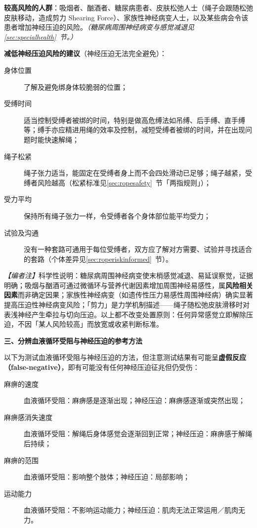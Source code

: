 \documentclass[12pt,UTF8]{ctexbook}
\begin{document}
\textbf{较高风险的人群}：吸烟者、酗酒者、糖尿病患者、皮肤松弛人士（绳子会跟随松弛皮肤移动，造成剪力 Shearing Force）、家族性神经病变人士，以及某些病会令该患者增加神经压迫的风险。\textit{（糖尿病周围神经病变与感觉减退见\ref{sec:specialhealth}~节。）}

\textbf{减低神经压迫风险的建议}（神经压迫无法完全避免）：
\begin{description}
\item[身体位置] 了解及避免绑身体较脆弱的位置；
\item[受缚时间] 适当控制受缚者被绑的时间，特别是做高危缚法如吊缚、后手缚、直手缚等；缚手亦应精进用绳的效率及控制，减短受缚者被绑的时间，并在出现问题时能快速解绳；
\item[绳子松紧] 绳子张力适当，能固定在受缚者身上而不会四处滑动已足够；绳子越紧，受缚者风险越高（松紧标准见\ref{sec:ropesafety}~节「两指规则」）；
\item[受力平均] 保持所有绳子张力一样，令受缚者各个身体部位能平均受力；
\item[试验及沟通] 没有一种套路可通用于每位受缚者，双方应了解对方需要、试验并寻找适合的套路（个体差异见\ref{sec:roperiskinformed}~节）。
\end{description}

\noindent\textit{【编者注】}科学性说明：糖尿病周围神经病变使末梢感觉减退、易延误察觉，证据明确；吸烟与酗酒可通过微循环与营养代谢因素增加周围神经易感性，属\textbf{风险相关因素}而非确定因果；家族性神经病变（如遗传性压力易感性周围神经病）确实显著提高压迫性神经病变风险；「剪力」是力学机制描述——绳子随松弛皮肤滑移时对表浅神经产生牵拉与切向压迫。以上都不改变处置原则：任何异常感觉立即解除压迫，不因「某人风险较高」而放宽或收紧判断标准。

\noindent\textbf{三、分辨血液循环受阻与神经压迫的参考方法}

以下为测试血液循环受阻与神经压迫的方法，但注意测试结果有可能呈\textbf{虚假反应（false-negative）}，即有可能没有任何神经压迫征兆但仍受伤：
\begin{description}
\item[麻痹的速度] 血液循环受阻：麻痹感是逐渐出现；神经压迫：麻痹感逐渐或突然出现；
\item[麻痹感消失速度] 血液循环受阻：解绳后身体感觉会逐渐回到正常；神经压迫：麻痹感于解绳后持续；
\item[麻痹的范围] 血液循环受阻：影响整个肢体；神经压迫：局部影响；
\item[运动能力] 血液循环受阻：不影响运动能力；神经压迫：肌肉无法正常运用／肌肉无力。
\end{description}
\end{document}
